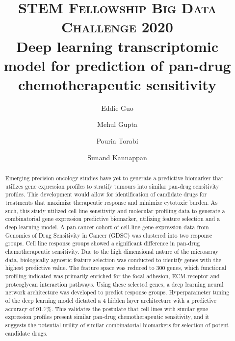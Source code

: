 \documentclass[10pt, letterpaper]{article}
\title{
    \usefont{OT1}{bch}{b}{n}
    \normalfont \normalsize \textsc{STEM Fellowship Big Data Challenge 2020} \\ [10pt]
    \huge Deep learning transcriptomic model for prediction of pan-drug chemotherapeutic sensitivity \\
}
\author[1]{Eddie Guo}
\author[2]{Mehul Gupta}
\author[1]{Pouria Torabi}
\author[2]{Sunand Kannappan}
\affil[1]{University of Alberta}
\affil[2]{University of Calgary}
\begin{document}
\maketitle


\begin{abstract}
	Emerging precision oncology studies have yet to generate a predictive biomarker that utilizes gene expression profiles to stratify tumours into similar pan-drug sensitivity profiles. This development would allow for identification of candidate drugs for treatments that maximize therapeutic response and minimize cytotoxic burden. As such, this study utilized cell line sensitivity and molecular profiling data to generate a combinatorial gene expression predictive biomarker, utilizing feature selection and a deep learning model. A pan-cancer cohort of cell-line gene expression data from Genomics of Drug Sensitivity in Cancer (GDSC) was clustered into two response groups. Cell line response groups showed a significant difference in pan-drug chemotherapeutic sensitivity. Due to the high dimensional nature of the microarray data, biologically agnostic feature selection was conducted to identify genes with the highest predictive value. The feature space was reduced to 300 genes, which functional profiling indicated was primarily enriched for the focal adhesion, ECM-receptor and proteoglycan interaction pathways. Using these selected genes, a deep learning neural network architecture was developed to predict response groups. Hyperparameter tuning of the deep learning model dictated a 4 hidden layer architecture with a predictive accuracy of 91.7\%.  This validates the postulate that cell lines with similar gene expression profiles present similar pan-drug chemotherapeutic sensitivity, and it suggests the potential utility of similar combinatorial biomarkers for selection of potent candidate drugs. \vspace{1em}

\end{abstract} \vspace{1em}
\end{document}
